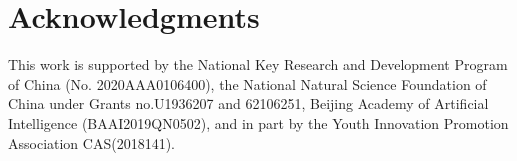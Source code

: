 \documentclass[11pt]{article}
\begin{document}
\section{Acknowledgments}
This work is supported by the National Key Research and Development Program of China (No. 2020AAA0106400), the National Natural Science Foundation of China under Grants no.U1936207 and 62106251, Beijing Academy of Artificial Intelligence (BAAI2019QN0502), and in part by the Youth Innovation Promotion Association CAS(2018141).



\label{sec:appendix}
\label{sec:supplemental}
\end{document}
